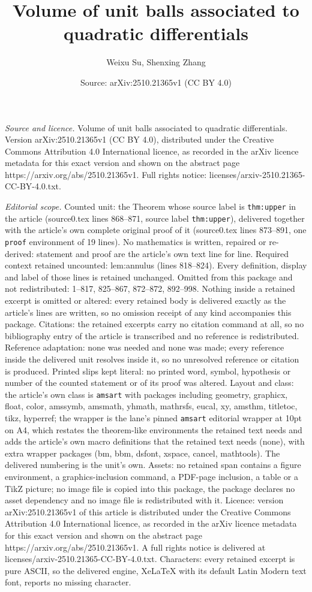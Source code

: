 \documentclass[10pt,a4paper]{amsart}
\title[Volume of unit balls associated to quadratic differentials]{Volume of unit balls associated to quadratic differentials}
\author{Weixu Su, Shenxing Zhang}
\date{Source: arXiv:2510.21365v1 (CC BY 4.0)}
\begin{document}
\maketitle

\noindent\emph{Source and licence.} Volume of unit balls associated to quadratic differentials. Version arXiv:2510.21365v1 (CC BY 4.0), distributed under the Creative Commons Attribution 4.0 International licence, as recorded in the arXiv licence metadata for this exact version and shown on the abstract page https://arxiv.org/abs/2510.21365v1. Full rights notice: licenses/arxiv-2510.21365-CC-BY-4.0.txt.\par\smallskip

\noindent\textit{Editorial scope.} Counted unit: the Theorem whose source label is \texttt{thm:upper} in the article (source0.tex lines 868--871, source label \texttt{thm:upper}), delivered together with the article's own complete original proof of it (source0.tex lines 873--891, one \texttt{proof} environment of 19 lines). No mathematics is written, repaired or re-derived: statement and proof are the article's own text line for line. Required context retained uncounted: lem:annulus (lines 818--824). Every definition, display and label of those lines is retained unchanged. Omitted from this package and not redistributed: 1--817, 825--867, 872--872, 892--998. Nothing inside a retained excerpt is omitted or altered: every retained body is delivered exactly as the article's lines are written, so no omission receipt of any kind accompanies this package. Citations: the retained excerpts carry no citation command at all, so no bibliography entry of the article is transcribed and no reference is redistributed. Reference adaptation: none was needed and none was made; every reference inside the delivered unit resolves inside it, so no unresolved reference or citation is produced. Printed slips kept literal: no printed word, symbol, hypothesis or number of the counted statement or of its proof was altered. Layout and class: the article's own class is \texttt{amsart} with packages including geometry, graphicx, float, color, amssymb, amsmath, yhmath, mathrsfs, eucal, xy, amsthm, titletoc, tikz, hyperref; the wrapper is the lane's pinned \texttt{amsart} editorial wrapper at 10pt on A4, which restates the theorem-like environments the retained text needs and adds the article's own macro definitions that the retained text needs (none), with extra wrapper packages (bm, bbm, dsfont, xspace, cancel, mathtools). The delivered numbering is the unit's own. Assets: no retained span contains a figure environment, a graphics-inclusion command, a PDF-page inclusion, a table or a TikZ picture; no image file is copied into this package, the package declares no asset dependency and no image file is redistributed with it. Licence: version arXiv:2510.21365v1 of this article is distributed under the Creative Commons Attribution 4.0 International licence, as recorded in the arXiv licence metadata for this exact version and shown on the abstract page https://arxiv.org/abs/2510.21365v1. A full rights notice is delivered at licenses/arxiv-2510.21365-CC-BY-4.0.txt. Characters: every retained excerpt is pure ASCII, so the delivered engine, XeLaTeX with its default Latin Modern text font, reports no missing character.
\end{document}
